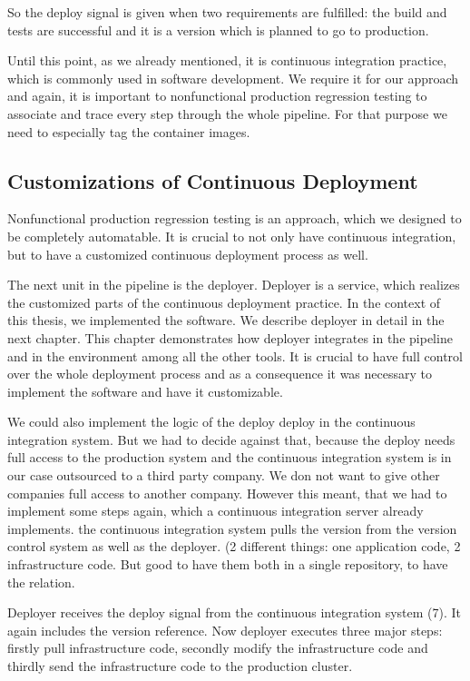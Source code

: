 So the deploy signal is given when two requirements are fulfilled: the build and tests are
successful and it is a version which is planned to go to production.

Until this point, as we already mentioned, it is continuous integration practice, which is commonly used in software development. We require it for our approach and again, it is important to nonfunctional production regression testing to associate and trace every step through the whole pipeline. For that purpose we need to especially tag the container images.

\subsection{Customizations of Continuous Deployment}

Nonfunctional production regression testing is an approach, which we designed to be
completely automatable. It is crucial to not only have continuous integration, but to have a customized continuous deployment process as well.

The next unit in the pipeline is the deployer. Deployer is a service, which realizes the customized parts of the continuous deployment practice. In the context of this thesis, we implemented the software. We describe deployer in detail in the next chapter. This chapter
demonstrates how deployer integrates in the pipeline and in the
environment among all the other tools. It is crucial to have full control over the whole deployment process and as a
consequence it was necessary to implement the software and have it customizable.

We could also implement the logic of the deploy deploy in the continuous integration
system. But we had to decide against that, because the deploy needs full access to the
production system and the continuous integration system is in our case outsourced to a
third party company. We don not want to give other companies full access to another
company. However this meant, that we had to implement some steps again, which a continuous
integration server already implements.
the continuous integration system pulls the version from the version control system as well as the deployer. (2 different things: one application code, 2 infrastructure code. But good to have them both in a single repository, to have the relation.

Deployer receives the deploy signal from the continuous integration system (7). It again
includes the version reference. Now deployer executes three major steps: firstly pull infrastructure code, secondly modify the infrastructure code and thirdly send the infrastructure code to the production cluster.

